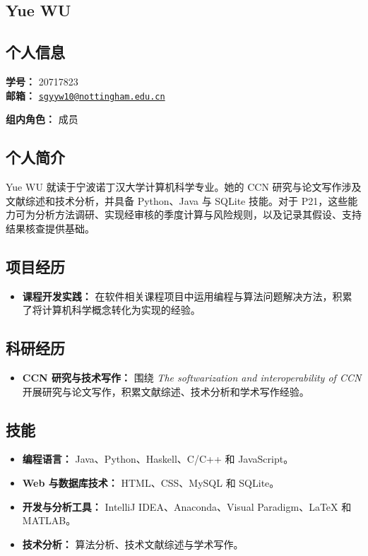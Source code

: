 \documentclass[a4paper,12pt]{article}
\newcommand{\PersonalInformation}[2]{%
  \subsection*{个人信息}
  \if\relax\detokenize{#1}\relax\else
  \noindent\textbf{学号：} #1\\
  \fi
  \textbf{邮箱：} #2\par
}
\begin{document}
\subsection{Yue WU}
\PersonalInformation{20717823}{\href{mailto:sgyyw10@nottingham.edu.cn}{\nolinkurl{sgyyw10@nottingham.edu.cn}}}
\noindent\textbf{组内角色：} 成员\par

\subsection*{个人简介}
Yue WU 就读于宁波诺丁汉大学计算机科学专业。她的 CCN 研究与论文写作涉及文献综述和技术分析，并具备 Python、Java 与 SQLite 技能。对于 P21，这些能力可为分析方法调研、实现经审核的季度计算与风险规则，以及记录其假设、支持结果核查提供基础。

\subsection*{项目经历}
\begin{itemize}
  \item \textbf{课程开发实践：} 在软件相关课程项目中运用编程与算法问题解决方法，积累了将计算机科学概念转化为实现的经验。
\end{itemize}

\subsection*{科研经历}
\begin{itemize}
  \item \textbf{CCN 研究与技术写作：} 围绕 \emph{The softwarization and interoperability of CCN} 开展研究与论文写作，积累文献综述、技术分析和学术写作经验。
\end{itemize}

\subsection*{技能}
\begin{itemize}
  \item \textbf{编程语言：} Java、Python、Haskell、C/C++ 和 JavaScript。
  \item \textbf{Web 与数据库技术：} HTML、CSS、MySQL 和 SQLite。
  \item \textbf{开发与分析工具：} IntelliJ IDEA、Anaconda、Visual Paradigm、LaTeX 和 MATLAB。
  \item \textbf{技术分析：} 算法分析、技术文献综述与学术写作。
\end{itemize}
\end{document}
